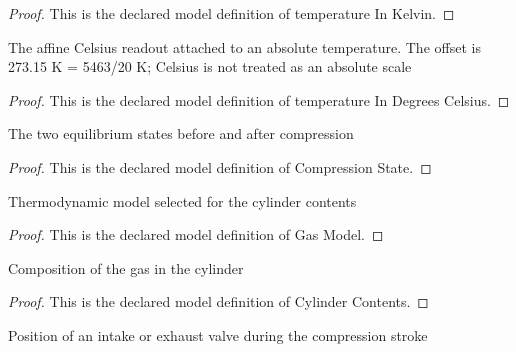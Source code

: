 \begin{proof}
  This is the declared model definition of temperature In Kelvin.
\end{proof}
\begin{definition}
  \label{def:physics:phyx-mini-0469:phyxminiproblems-problemphyxmini0469-temperatureindegreescelsius}
  The affine Celsius readout attached to an absolute temperature. The offset is 273.15 K = 5463/20 K; Celsius is not treated as an absolute scale
\end{definition}
\begin{proof}
  This is the declared model definition of temperature In Degrees Celsius.
\end{proof}
\begin{definition}
  \label{def:physics:phyx-mini-0469:phyxminiproblems-problemphyxmini0469-compressionstate}
  The two equilibrium states before and after compression
\end{definition}
\begin{proof}
  This is the declared model definition of Compression State.
\end{proof}
\begin{definition}
  \label{def:physics:phyx-mini-0469:phyxminiproblems-problemphyxmini0469-gasmodel}
  Thermodynamic model selected for the cylinder contents
\end{definition}
\begin{proof}
  This is the declared model definition of Gas Model.
\end{proof}
\begin{definition}
  \label{def:physics:phyx-mini-0469:phyxminiproblems-problemphyxmini0469-cylindercontents}
  Composition of the gas in the cylinder
\end{definition}
\begin{proof}
  This is the declared model definition of Cylinder Contents.
\end{proof}
\begin{definition}
  \label{def:physics:phyx-mini-0469:phyxminiproblems-problemphyxmini0469-valveposition}
  Position of an intake or exhaust valve during the compression stroke
\end{definition}
